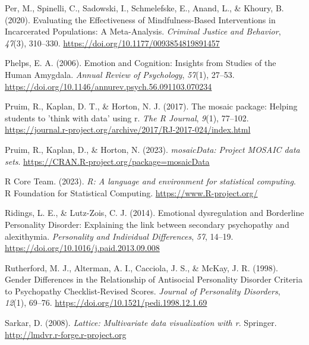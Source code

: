 \documentclass[
  man,floatsintext]{apa7}
\newlength{\cslhangindent}
\newlength{\cslentryspacingunit} %
\newenvironment{CSLReferences}[2] %
 {%
  \setlength{\parindent}{0pt}
  \ifodd #1
  \let\oldpar\par
  \def\par{\hangindent=\cslhangindent\oldpar}
  \fi
  \setlength{\parskip}{#2\cslentryspacingunit}
 }%
 {}
\begin{document}
\begin{CSLReferences}{1}{0}
\leavevmode{}%
Per, M., Spinelli, C., Sadowski, I., Schmelefske, E., Anand, L., \& Khoury, B. (2020). Evaluating the {Effectiveness} of {Mindfulness-Based Interventions} in {Incarcerated Populations}: {A Meta-Analysis}. \emph{Criminal Justice and Behavior}, \emph{47}(3), 310--330. \url{https://doi.org/10.1177/0093854819891457}

\leavevmode{}%
Phelps, E. A. (2006). Emotion and {Cognition}: {Insights} from {Studies} of the {Human Amygdala}. \emph{Annual Review of Psychology}, \emph{57}(1), 27--53. \url{https://doi.org/10.1146/annurev.psych.56.091103.070234}

\leavevmode{}%
Pruim, R., Kaplan, D. T., \& Horton, N. J. (2017). The mosaic package: Helping students to 'think with data' using r. \emph{The R Journal}, \emph{9}(1), 77--102. \url{https://journal.r-project.org/archive/2017/RJ-2017-024/index.html}

\leavevmode{}%
Pruim, R., Kaplan, D., \& Horton, N. (2023). \emph{mosaicData: Project MOSAIC data sets}. \url{https://CRAN.R-project.org/package=mosaicData}

\leavevmode{}%
R Core Team. (2023). \emph{R: A language and environment for statistical computing}. R Foundation for Statistical Computing. \url{https://www.R-project.org/}

\leavevmode{}%
Ridings, L. E., \& Lutz-Zois, C. J. (2014). Emotional dysregulation and {Borderline Personality Disorder}: {Explaining} the link between secondary psychopathy and alexithymia. \emph{Personality and Individual Differences}, \emph{57}, 14--19. \url{https://doi.org/10.1016/j.paid.2013.09.008}

\leavevmode{}%
Rutherford, M. J., Alterman, A. I., Cacciola, J. S., \& McKay, J. R. (1998). Gender {Differences} in the {Relationship} of {Antisocial Personality Disorder Criteria} to {Psychopathy Checklist-Revised Scores}. \emph{Journal of Personality Disorders}, \emph{12}(1), 69--76. \url{https://doi.org/10.1521/pedi.1998.12.1.69}

\leavevmode{}%
Sarkar, D. (2008). \emph{Lattice: Multivariate data visualization with r}. Springer. \url{http://lmdvr.r-forge.r-project.org}


\end{CSLReferences}
\end{document}
